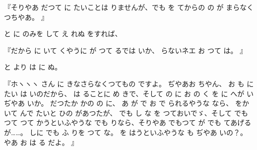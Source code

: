 『そりやあ
だつて
に
たいことは
りませんが、でも
を
てからの
の
が
まらなくつちやあ。
』

と
に
のみを
して
え
れぬ
をすれば、

『だから
に
いて
くやうに
が
つて
るでは
いか、
らないネエ
お
つて
は。
』

と
より
は
に
ぬ。

『ホヽヽヽ
さん
に
きなさらなくつてもの
ですよ。
ぢやあお
ちやん、
お
も
に
たい
は
いのだから、
は
ることに
め
きで、そして
の
に
お
の
く
を
に
へが
いぢやあ
いか。
だつたか
かの
の
に、
あ
が
で
お
で
られるやうな
なら、
をかいて
んで
たいと
ひの
があつたが、
でも
し
な
を
つておいでゞ、そして
でもつて
つて
かうといふやうな
でも
りなら、そりやあ
でもつて
が
でも
てあげるが……。
しに
でも
ふ
りを
つて
な。
を
はうといふやうな
も
ぢやあ
いの？。
やあ
お
は
る
だよ。
』

